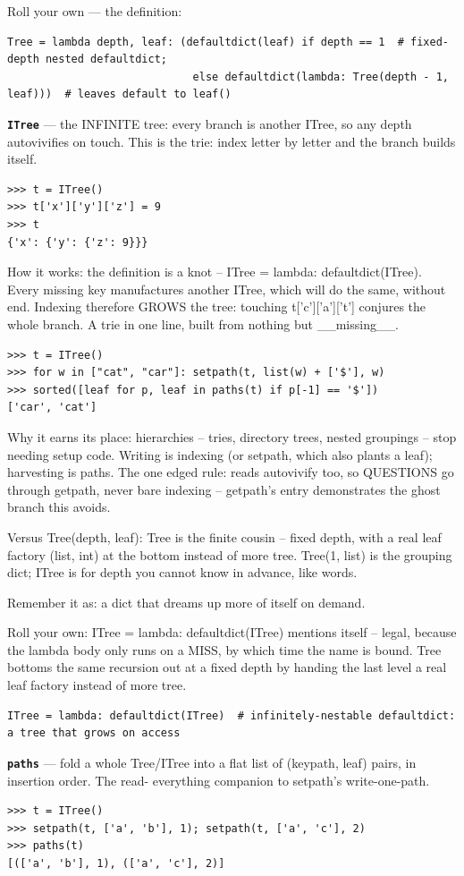 \documentclass[10pt,letterpaper]{article}
\begin{document}
Roll your own --- the definition:

\begin{lstlisting}[style=ex]
Tree = lambda depth, leaf: (defaultdict(leaf) if depth == 1  # fixed-depth nested defaultdict;
                             else defaultdict(lambda: Tree(depth - 1, leaf)))  # leaves default to leaf()
\end{lstlisting}
\textbf{\texttt{ITree}} --- the INFINITE tree: every branch is another ITree, so any depth autovivifies on touch. This is the trie: index letter by letter and the branch builds itself.
\begin{lstlisting}[style=ex]
>>> t = ITree()
>>> t['x']['y']['z'] = 9
>>> t
{'x': {'y': {'z': 9}}}
\end{lstlisting}

How it works: the definition is a knot -- ITree = lambda: defaultdict(ITree). Every missing key manufactures another ITree, which will do the same, without end. Indexing therefore GROWS the tree: touching t['c']['a']['t'] conjures the whole branch. A trie in one line, built from nothing but \_\_missing\_\_.

\begin{lstlisting}[style=ex]
>>> t = ITree()
>>> for w in ["cat", "car"]: setpath(t, list(w) + ['$'], w)
>>> sorted([leaf for p, leaf in paths(t) if p[-1] == '$'])
['car', 'cat']
\end{lstlisting}

Why it earns its place: hierarchies -- tries, directory trees, nested groupings -- stop needing setup code. Writing is indexing (or setpath, which also plants a leaf); harvesting is paths. The one edged rule: reads autovivify too, so QUESTIONS go through getpath, never bare indexing -- getpath's entry demonstrates the ghost branch this avoids.


Versus Tree(depth, leaf): Tree is the finite cousin -- fixed depth, with a real leaf factory (list, int) at the bottom instead of more tree. Tree(1, list) is the grouping dict; ITree is for depth you cannot know in advance, like words.


Remember it as: a dict that dreams up more of itself on demand.


Roll your own: ITree = lambda: defaultdict(ITree) mentions itself -- legal, because the lambda body only runs on a MISS, by which time the name is bound. Tree bottoms the same recursion out at a fixed depth by handing the last level a real leaf factory instead of more tree.

\begin{lstlisting}[style=ex]
ITree = lambda: defaultdict(ITree)  # infinitely-nestable defaultdict: a tree that grows on access
\end{lstlisting}
\textbf{\texttt{paths}} --- fold a whole Tree/ITree into a flat list of (keypath, leaf) pairs, in insertion order. The read- everything companion to setpath's write-one-path.
\begin{lstlisting}[style=ex]
>>> t = ITree()
>>> setpath(t, ['a', 'b'], 1); setpath(t, ['a', 'c'], 2)
>>> paths(t)
[(['a', 'b'], 1), (['a', 'c'], 2)]
\end{lstlisting}
\end{document}
